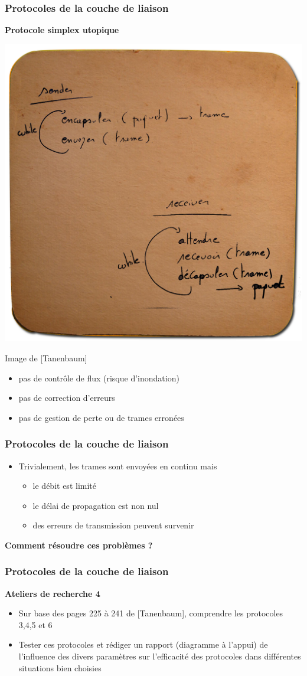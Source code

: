 \begin{frame}[fragile]
  \frametitle{Protocoles de la couche de liaison}
{\large\bf Protocole simplex utopique}
\begin{center}
	\includegraphics[width=.4\linewidth]{img/sousbock-protocole-1.png}
	\par{\scriptsize Image de [Tanenbaum]} 
\end{center}
\begin{itemize}
	\item pas de contrôle de flux (risque d'inondation)
	\item pas de correction d'erreurs
	\item pas de gestion de perte ou de trames erronées
\end{itemize}
\end{frame}

\begin{frame}[fragile]
  \frametitle{ Protocoles de la couche de liaison}
\begin{itemize}
	\item Trivialement, les trames sont envoyées en continu mais
	\begin{itemize}
		\item le débit est limité
		\item le délai de propagation est non nul
		\item des erreurs de transmission peuvent survenir
	\end{itemize}
\end{itemize}
\begin{center}
	\bf Comment résoudre ces problèmes ?
\end{center}
\end{frame}

\begin{frame}[fragile]
	\frametitle{Protocoles de la couche de liaison}
{\large\bf Ateliers de recherche 4}
\begin{itemize}
	\item Sur base des pages 225 à 241 de [Tanenbaum], comprendre les protocoles
	3,4,5 et 6
	\item Tester ces protocoles et rédiger un rapport (diagramme à l'appui) de
	l'influence des divers paramètres sur l'efficacité des protocoles dans
	différentes situations bien choisies
\end{itemize}
\end{frame}



